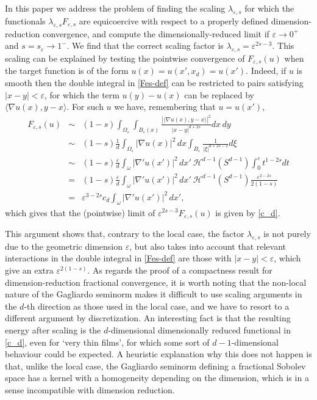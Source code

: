 \documentclass{article}
\newcommand{\e}{\varepsilon}
\begin{document}
\smallskip
In this paper we address the problem of finding the scaling $\lambda_{\e,s}$ for which the functionals 
$\lambda_{\e,s} F_{\e,s}$ are equicoercive with respect to a properly defined dimension-reduction convergence, and compute the dimensionally-reduced limit if $\e\to 0^+$ and $s=s_\e\to 1^-$. 
We find that the correct scaling factor is $\lambda_{\e,s}=\e^{2s-3}$. This scaling can be explained by testing the pointwise convergence of $F_{\e,s}(u)$ when the target function is of the form $u(x)=u(x',x_d)=u(x')$.  Indeed, if $u$ is smooth then the double integral in \eqref{Fes-def} can be restricted to pairs satisfying $|x-y|<\e$, for which the term $u(y)-u(x)$ can be replaced by $\langle \nabla u(x),y-x\rangle$. For such $u$ we have, remembering that $u=u(x')$,
\begin{eqnarray*}
F_{\e,s}(u)&\sim& (1-s) \int_{\Omega_\e} \int_{B_\e(x)}\frac{|\langle \nabla u(x),y-x\rangle|^2}{|x-y|^{d+2s}} dx\,dy
\\
&\sim& (1-s) \frac1d\int_{\Omega_\e} |\nabla u(x)|^2 \,dx \int_{B_\e}\frac{1}{|\xi|^{d+2s-2}} d\xi
\\
&\sim& (1-s) \frac\e{d}\int_{\omega} |\nabla' u(x')|^2 \,dx'\  \mathcal H^{d-1}(S^{d-1})\int_{0}^{\e}{t^{1-2s}} dt
\\
&=& (1-s) \frac\e{d}\int_{\omega} |\nabla' u(x')|^2 \,dx'\  \mathcal H^{d-1}(S^{d-1})\frac{\e^{2-2s}}{2(1-s)} 
\\
&=& \e^{3-2s} c_d\int_{\omega} |\nabla' u(x')|^2 \,dx', 
\end{eqnarray*} 
which gives that the (pointwise) limit of $\e^{2s-3}F_{\e,s}(u)$ is given by \eqref{c_d}.

This argument shows that, contrary to the local case, the factor $\lambda_{\e,s}$ is not purely due to the geometric dimension $\e$, but also takes into account that relevant interactions in the double integral in \eqref{Fes-def} are those with $|x-y|<\e$, which give an extra $\e^{2(1-s)}$. As regards the proof of a compactness result for di\-men\-sion-reduction fractional convergence, it is worth noting that the non-local nature of the Gagliardo seminorm makes it difficult to use scaling arguments in the $d$-th direction as those used in the local case, and we have to resort to a different  argument by discretization. An interesting fact is that the resulting energy after scaling is the $d$-dimensional dimensionally reduced functional in \eqref{c_d}, even for `very thin films', for which some sort of $d-1$-dimensional behaviour could be expected. A heuristic explanation why this does not happen is that, unlike the local case, the Gagliardo seminorm defining a fractional Sobolev space has a kernel with a homogeneity depending on the dimension, which is in a sense incompatible with dimension reduction.
\end{document}
